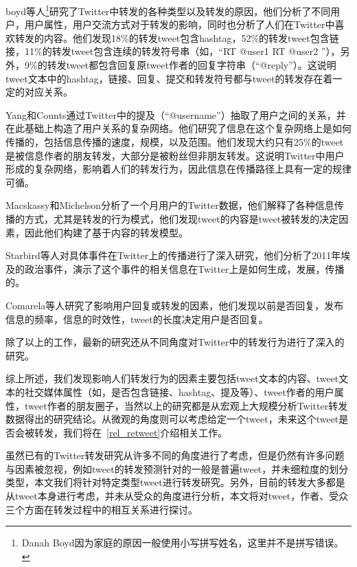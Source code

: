 boyd等人\footnote{Danah Boyd因为家庭的原因一般使用小写拼写姓名，这里并不是拼写错误。}研究了Twitter中转发的各种类型以及转发的原因，他们分析了不同用户，用户属性，用户交流方式对于转发的影响，同时也分析了人们在Twitter中喜欢转发的内容。他们发现18\%的转发tweet包含hashtag，52\%的转发tweet包含链接，11\%的转发tweet包含连续的转发符号串（如，“RT @user1 RT @user2 ”），另外，9\%的转发tweet都包含回复原tweet作者的回复字符串（“@reply”）。这说明tweet文本中的hashtag，链接、回复、提交和转发符号都与tweet的转发存在着一定的对应关系。

Yang和Counts通过Twitter中的提及（“@username”）抽取了用户之间的关系，并在此基础上构造了用户关系的复杂网络。他们研究了信息在这个复杂网络上是如何传播的，包括信息传播的速度，规模，以及范围。他们发现大约只有25\%的tweet是被信息作者的朋友转发，大部分是被粉丝但非朋友转发。这说明Twitter中用户形成的复杂网络，影响着人们的转发行为，因此信息在传播路径上具有一定的规律可循。

Macskassy和Michelson分析了一个月用户的Twitter数据，他们解释了各种信息传播的方式，尤其是转发的行为模式，他们发现tweet的内容是tweet被转发的决定因素，因此他们构建了基于内容的转发模型。

Starbird等人对具体事件在Twitter上的传播进行了深入研究，他们分析了2011年埃及的政治事件，演示了这个事件的相关信息在Twitter上是如何生成，发展，传播的。

Comarela等人研究了影响用户回复或转发的因素，他们发现以前是否回复，发布信息的频率，信息的时效性，tweet的长度决定用户是否回复。

除了以上的工作，最新的研究还从不同角度对Twitter中的转发行为进行了深入的研究。

综上所述，我们发现影响人们转发行为的因素主要包括tweet文本的内容、tweet文本的社交媒体属性（如，是否包含链接、hashtag、提及等）、tweet作者的用户属性，tweet作者的朋友圈子，当然以上的研究都是从宏观上大规模分析Twitter转发数据得出的研究结论。从微观的角度则可以考虑给定一个tweet，未来这个tweet是否会被转发，我们将在~\ref{rel_retweet}介绍相关工作。

虽然已有的Twitter转发研究从许多不同的角度进行了考虑，但是仍然有许多问题与因素被忽视，例如tweet的转发预测针对的一般是普遍tweet，并未细粒度的划分类型，本文我们将针对特定类型tweet进行转发研究。另外，目前的转发大多都是从tweet本身进行考虑，并未从受众的角度进行分析，本文将对tweet，作者、受众三个方面在转发过程中的相互关系进行探讨。



